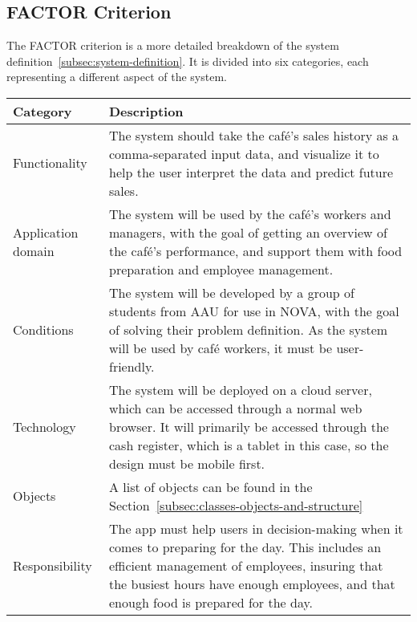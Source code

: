 \subsection{FACTOR Criterion}\label{subsec:factor-criterion}

The FACTOR criterion is a more detailed breakdown of the system definition~\ref{subsec:system-definition}.
It is divided into six categories, each representing a different aspect of the system.

\begin{tabular}{ m{2.5cm} m{10cm} }
    \toprule
    \textbf{Category} & \textbf{Description} \\
    \midrule
    Functionality & The system should take the café's sales history as a comma-separated input data, and visualize it to
    help the user interpret the data and predict future sales. \\
    \midrule
    Application domain & The system will be used by the café's workers and managers, with the goal of getting an
    overview of the café's performance, and support them with food preparation and employee management. \\
    \midrule
    Conditions & The system will be developed by a group of students from AAU for use in NOVA, with the goal of solving
    their problem definition.
    As the system will be used by café workers, it must be user-friendly. \\
    \midrule
    Technology & The system will be deployed on a cloud server, which can be accessed through a normal web browser.
    It will primarily be accessed through the cash register, which is a tablet in this case, so the design must be
    mobile first. \\
    \midrule
    Objects & A list of objects can be found in the Section~\ref{subsec:classes-objects-and-structure} \\
    \midrule
    Responsibility & The app must help users in decision-making when it comes to preparing for the day.
    This includes an efficient management of employees, insuring that the busiest hours have enough employees, and
    that enough food is prepared for the day. \\
    \bottomrule
\end{tabular}
